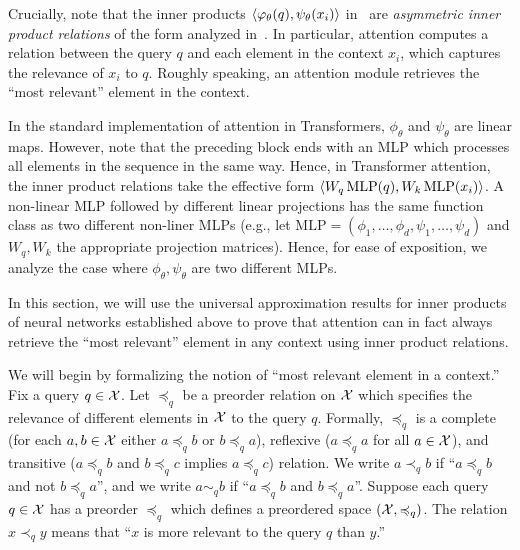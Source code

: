 Crucially, note that the inner products $\left \langle \varphi_\theta(q), \psi_\theta(x_i) \right\rangle$ in~ are \textit{asymmetric inner product relations} of the form analyzed in~. In particular, attention computes a relation between the query $q$ and each element in the context $x_i$, which captures the relevance of $x_i$ to $q$. Roughly speaking, an attention module retrieves the ``most relevant'' element in the context.

\begin{remark}
    In the standard implementation of attention in Transformers, $\phi_\theta$ and $\psi_\theta$ are linear maps. However, note that the preceding block ends with an MLP which processes all elements in the sequence in the same way. Hence, in Transformer attention, the inner product relations take the effective form $\langle W_q \, \mathrm{MLP}(q), W_k \, \mathrm{MLP}(x_i) \rangle$. A non-linear MLP followed by different linear projections has the same function class as two different non-liner MLPs (e.g., let $\mathrm{MLP} = (\phi_1, \ldots, \phi_d, \psi_1, \ldots, \psi_d)$ and $W_q, W_k$ the appropriate projection matrices). Hence, for ease of exposition, we analyze the case where $\phi_\theta, \psi_\theta$ are two different MLPs.
\end{remark}

In this section, we will use the universal approximation results for inner products of neural networks established above to prove that attention can in fact always retrieve the ``most relevant'' element in any context using inner product relations.

We will begin by formalizing the notion of ``most relevant element in a context.'' Fix a query $q \in {\mathcal{X}}$. Let $\preceq_q$ be a preorder relation on ${\mathcal{X}}$ which specifies the relevance of different elements in ${\mathcal{X}}$ to the query $q$. Formally, $\preceq_q$ is a complete (for each $a,b \in {\mathcal{X}}$ either $a \preceq_q b$ or $b \preceq_q a$), reflexive ($a \preceq_q a$ for all $a \in {\mathcal{X}}$), and transitive ($a \preceq_q b$ and $b \preceq_q c$ implies $a \preceq_q c$) relation.  We write $a \prec_q b$ if ``$a \preceq_q b$ and not $b \preceq_q a$'', and we write $a \sim_q b$ if ``$a \preceq_q b$ and $b \preceq_q a$''. Suppose each query $q \in {\mathcal{X}}$ has a preorder $\preceq_q$ which defines a preordered space $({\mathcal{X}}, \preccurlyeq_q)$. The relation $x \prec_q y$ means that ``$x$ is more relevant to the query $q$ than $y$.''

